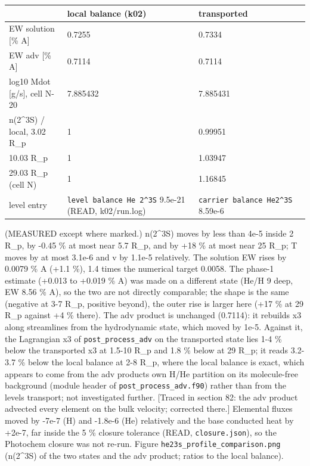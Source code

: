 \documentclass[english,a4paper]{my_memo}
\begin{document}
{\def\LTcaptype{none} %
{\small
\begin{longtable}[]{@{}lll@{}}
\toprule\noalign{}
& local balance (k02) & transported \\
\midrule\noalign{}
\endhead
\bottomrule\noalign{}
\endlastfoot
EW solution {[}\% A{]} & 0.7255 & 0.7334 \\
EW adv {[}\% A{]} & 0.7114 & 0.7114 \\
log10 Mdot {[}g/s{]}, cell N-20 & 7.885432 & 7.885431 \\
n(2\^{}3S) / local, 3.02 R\_p & 1 & 0.99951 \\
10.03 R\_p & 1 & 1.03947 \\
29.03 R\_p (cell N) & 1 & 1.16845 \\
level entry & \texttt{level\ balance\ He\ 2\^{}3S} 9.5e-21 (READ, k02/run.log) & \texttt{carrier\ balance\ He2\^{}3S} 8.59e-6 \\
\end{longtable}
}
}

(MEASURED except where marked.) n(2\^{}3S) moves by less than 4e-5 inside
2 R\_p, by -0.45 \% at most near 5.7 R\_p, and by +18 \% at most near 25 R\_p;
T moves by at most 3.1e-6 and v by 1.1e-5 relatively. The solution EW rises
by 0.0079 \% A (+1.1 \%), 1.4 times the numerical target 0.0058. The phase-1
estimate (+0.013 to +0.019 \% A) was made on a different state (He/H 9 deep,
EW 8.56 \% A), so the two are not directly comparable; the shape is the
same (negative at 3-7 R\_p, positive beyond), the outer rise is larger here
(+17 \% at 29 R\_p against +4 \% there). The adv product is unchanged (0.7114):
it rebuilds x3 along streamlines from the hydrodynamic state, which moved
by 1e-5. Against it, the Lagrangian x3 of \texttt{post\_process\_adv} on the
transported state lies 1-4 \% below the transported x3 at 1.5-10 R\_p and
1.8 \% below at 29 R\_p; it reads 3.2-3.7 \% below the local balance at
2-8 R\_p, where the local balance is exact, which appears to come from the
adv product\textquotesingle s own H/He partition on its molecule-free background (module
header of \texttt{post\_process\_adv.f90}) rather than from the level\textquotesingle s transport;
not investigated further. {[}Traced in section 82: the adv product advected every
element on the bulk velocity; corrected there.{]} Elemental fluxes moved by -7e-7 (H) and -1.8e-6
(He) relatively and the base conducted heat by +2e-7, far inside the 5 \%
closure tolerance (READ, \texttt{closure.json}), so the Photochem closure was not
re-run. Figure \texttt{he23s\_profile\_comparison.png} (n(2\^{}3S) of the two states
and the adv product; ratios to the local balance).
\end{document}
